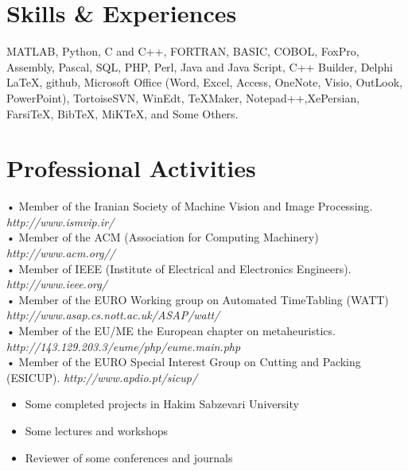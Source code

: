 \documentclass[10pt,a4paper]{moderncv}
\begin{document}
\section{Skills \& Experiences}
{MATLAB, Python, C and C++,  FORTRAN, BASIC, COBOL, FoxPro,  Assembly, Pascal, SQL, PHP, Perl, Java and Java Script, C++ Builder, Delphi} {}{}{}{}
{ \LaTeX, github, Microsoft Office (Word, Excel, Access, OneNote, Visio,
 OutLook, PowerPoint), TortoiseSVN, WinEdt, TeXMaker, Notepad++,XePersian,
 Farsi\TeX, Bib\TeX, MiKTeX, and Some Others.} {}{}{}{} %

\newpage
\section{Professional Activities}

{\small • Member of the Iranian Society of Machine Vision and Image Processing. \hfill {\scriptsize\em http://www.ismvip.ir/}}\\
{\small • Member of the ACM (Association for Computing Machinery) \hfill {\scriptsize\em http://www.acm.org//}}\\
{\small • Member of IEEE (Institute of Electrical and Electronics Engineers). \hfill {\scriptsize\em http://www.ieee.org/}}\\
{\small • Member of the EURO Working group on Automated TimeTabling (WATT) \hfill {\scriptsize\em http://www.asap.cs.nott.ac.uk/ASAP/watt/}}\\
{\small • Member of the EU/ME the European chapter on metaheuristics. \hfill {\scriptsize\em http://143.129.203.3/eume/php/eume.main.php}}\\
{\small • Member of the EURO Special Interest Group on Cutting and Packing (ESICUP). \hfill {\scriptsize\em http://www.apdio.pt/sicup/}}

\begin{itemize}
\item Some completed projects in Hakim Sabzevari University
\item Some lectures and workshops%
\item Reviewer of some conferences and journals
\end{itemize}
\end{document}
